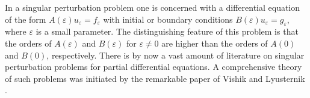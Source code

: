 \documentclass[10pt,a4paper]{article}
\begin{document}
In a singular perturbation problem one is concerned with a differential equation of the form
$A (\varepsilon) u_\varepsilon = f_\varepsilon$
with initial or boundary conditions
$B (\varepsilon) u_\varepsilon = g_\varepsilon$,
where $\varepsilon$ is a small parameter.
The distinguishing feature of this problem is that the orders of
$A (\varepsilon)$ and
$B (\varepsilon)$
for $\varepsilon \neq 0$ are higher than the orders of $A (0)$ and
$B (0)$,
respectively.
%
%
There is by now a vast amount of literature on singular perturbation
%
problems for partial differential equations.
A comprehensive theory of such problems was initiated by the remarkable paper of
Vishik and Lyusternik \cite{VishLyus57}.
\end{document}
